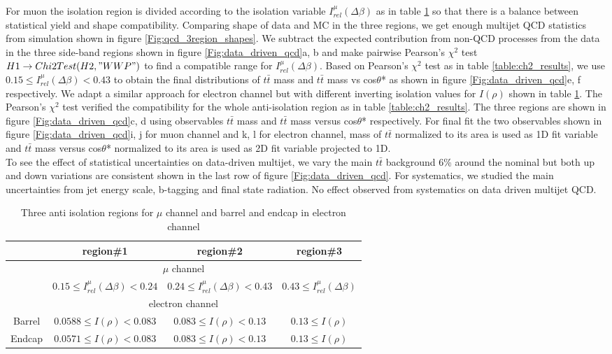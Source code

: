 For muon the isolation region is divided according to the isolation variable $I_{rel}^{\mu}(\Delta\beta)$ as in table \ref{table:3Aiso_regions} so that there is a balance between statistical yield and shape compatibility. Comparing shape of data and MC in the three regions, we get enough multijet QCD statistics from simulation shown in figure \ref{Fig:qcd_3region_shapes}. We subtract the expected contribution from non-QCD processes from the data in the three side-band regions shown in figure \ref{Fig:data_driven_qcd}a, b and make pairwise Pearson's $\chi^{2}$ test $H1 \rightarrow Chi2Test(H2, "WW P")$ to find a compatible range for $I_{rel}^{\mu}(\Delta\beta)$. Based on Pearson's $\chi^{2}$ test as in table \ref{table:ch2_results}, we use $0.15 \leq I_{rel}^{\mu}(\Delta\beta) < 0.43$ to obtain the final distributions of $t\bar{t}$ mass and $t\bar{t}$ mass vs cos$\theta$* as shown in figure \ref{Fig:data_driven_qcd}e, f respectively.
We adapt a similar approach for electron channel but with different inverting isolation values for $I(\rho)$ shown in table \ref{table:3Aiso_regions}. The Pearson's $\chi^{2}$ test verified the compatibility for the whole anti-isolation region as in table \ref{table:ch2_results}. The three regions are shown in figure \ref{Fig:data_driven_qcd}c, d using observables $t\bar{t}$ mass and  $t\bar{t}$ mass versus cos$\theta$* respectively. For final fit the two observables shown in figure \ref{Fig:data_driven_qcd}i, j for muon channel and k, l for electron channel, mass of $t\bar{t}$ normalized to its area is used as 1D fit variable and $t\bar{t}$ mass versus cos$\theta$* normalized to its area is used as 2D fit variable projected to 1D.\\
To see the effect of statistical uncertainties on data-driven multijet, we vary the main $t\bar{t}$ background 6\% around the nominal but both up and down variations are consistent shown in the last row of figure \ref{Fig:data_driven_qcd}. For systematics, we studied the main uncertainties from jet energy scale, b-tagging and final state radiation. No effect observed from systematics on data driven multijet QCD.
\begin{table}[ht]
\caption{Three anti isolation regions for $\mu$ channel and barrel and endcap in electron channel}
\centering
\begin{tabular}{c c c c}
\hline\hline
 & region\#1 & region\#2 & region\#3\\ [0.5ex]
\hline\hline
\multicolumn{4}{c}{$\mu$ channel}\\ \hline
& $0.15 \leq I_{rel}^{\mu}(\Delta\beta) < 0.24$ & $0.24 \leq I_{rel}^{\mu}(\Delta\beta) < 0.43$ & $0.43 \leq I_{rel}^{\mu}(\Delta\beta)$ \\
\hline
\multicolumn{4}{c}{electron channel}\\ \hline
Barrel & $0.0588 \leq I(\rho) < 0.083$ & $0.083 \leq I(\rho) < 0.13$ & $0.13 \leq I(\rho)$\\
Endcap & $0.0571 \leq I(\rho) < 0.083$ & $0.083 \leq I(\rho) < 0.13$ & $0.13 \leq I(\rho)$\\
\hline
\end{tabular}
\label{table:3Aiso_regions}
\end{table}
